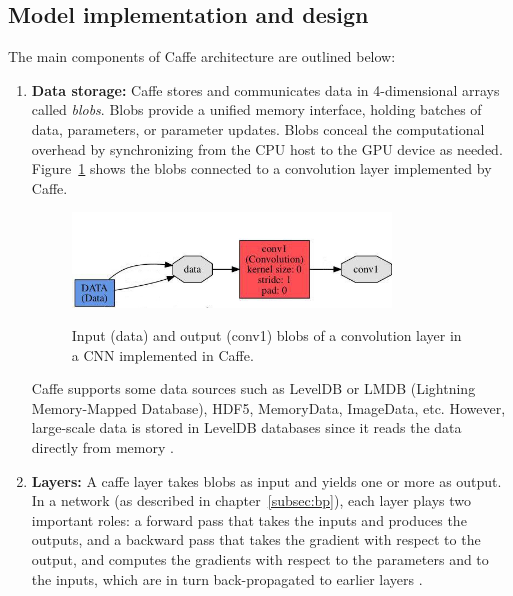 \subsection{Model implementation and design}
The main components of Caffe architecture are outlined below:
\begin{enumerate}

\item \textbf{Data storage:} Caffe stores and communicates data in 4-dimensional arrays called \textit{blobs}. Blobs provide a unified memory interface, holding batches of data, parameters, or parameter updates. Blobs conceal the computational overhead by synchronizing from the CPU host to the GPU device as needed. Figure~\ref{fig:blob} shows the blobs connected to a convolution layer implemented by Caffe.


\begin{figure}[H]
	\centering
	{\includegraphics[width=0.8\textwidth]{images/caffeconvlayer}}
	\caption{Input (data) and output (conv1) blobs of a convolution layer in a CNN implemented in Caffe.}
	\label{fig:blob}
\end{figure}


Caffe supports some data sources such as LevelDB or LMDB (Lightning Memory-Mapped Database), HDF5, MemoryData, ImageData, etc. However, large-scale data is stored in LevelDB databases since it reads the data directly from memory \cite{caffe}. 
\item \textbf{Layers:} A caffe layer takes blobs as input and yields one or more as output. In a network (as described in chapter~\ref{subsec:bp}), each layer plays two important roles: a forward pass that takes the inputs and produces the outputs, and a backward pass that takes the gradient with respect to the output, and computes the gradients with respect to the parameters and to the inputs, which are in turn back-propagated to earlier layers \cite{jia2014caffe}.


\end{enumerate}
